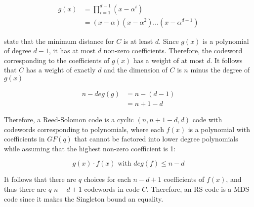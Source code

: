 \documentclass[../main.tex]{subfiles}
\begin{document}
    \begin{align*}
        g(x) &= \prod_{i=1}^{d-1} (x-\alpha^i)\\
             &= (x-\alpha)(x-\alpha^2)\dots(x-\alpha^{d-1})
    \end{align*}

    \noindent
    \autocite{trappe2006introduction} state that the minimum distance for $C$ is at least $d$. Since $g(x)$ is a polynomial of degree $d-1$, it has at most $d$ non-zero coefficients. Therefore, the codeword corresponding to the coefficients of $g(x)$ has a weight of at most $d$. It follows that $C$ has a weight of exactly $d$ and the dimension of $C$ is $n$ minus the degree of $g(x)$

    \begin{align*}
        n-deg(g) &= n-(d-1)\\
                 &= n+1-d
    \end{align*}

    \noindent
    Therefore, a Reed-Solomon code is a cyclic $(n, n+1-d, d)$ code with codewords corresponding to polynomials, where each $f(x)$ is a polynomial with coefficients in $GF(q)$ that cannot be factored into lower degree polynomials while assuming that the highest non-zero coefficient is 1:

    \begin{equation*}
        g(x) \cdot f(x) \text{ with } deg(f) \leq n-d
    \end{equation*}

    It follows that there are $q$ choices for each $n-d+1$ coefficients of $f(x)$, and thus there are $q$ $n-d+1$ codewords in code $C$. Therefore, an RS code is a MDS code since it makes the Singleton bound an equality.
\end{document}
